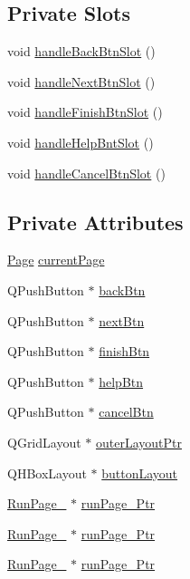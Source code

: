 \subsection*{Private Slots}
\begin{DoxyCompactItemize}
\item 
void \hyperlink{class_run_gui_abe8773e053b15ed96efcdb6e4b63e508}{handle\-Back\-Btn\-Slot} ()
\item 
void \hyperlink{class_run_gui_a267f472d21d57258adb28ebdcc83b256}{handle\-Next\-Btn\-Slot} ()
\item 
void \hyperlink{class_run_gui_a011495c9158d92b794941ac108b5b148}{handle\-Finish\-Btn\-Slot} ()
\item 
void \hyperlink{class_run_gui_ab29bf8394f8b23b2c1ffd33c6d2470eb}{handle\-Help\-Bnt\-Slot} ()
\item 
void \hyperlink{class_run_gui_a1127986fbf076ce480defe68d99171e1}{handle\-Cancel\-Btn\-Slot} ()
\end{DoxyCompactItemize}
\subsection*{Private Attributes}
\begin{DoxyCompactItemize}
\item 
\hyperlink{class_run_gui_acb4a3da6e31619ee4b0ac8c8f9cb64a3}{Page} \hyperlink{class_run_gui_a1d93e84df8a71767ca927554e5b0fe0d}{current\-Page}
\item 
Q\-Push\-Button $\ast$ \hyperlink{class_run_gui_a5a79c5d8f3a61510c2be51738e428473}{back\-Btn}
\item 
Q\-Push\-Button $\ast$ \hyperlink{class_run_gui_a02bb63cd6c6d77933f98087111ce1a66}{next\-Btn}
\item 
Q\-Push\-Button $\ast$ \hyperlink{class_run_gui_a2989fde08a236488c152c8fa584c3380}{finish\-Btn}
\item 
Q\-Push\-Button $\ast$ \hyperlink{class_run_gui_a6c0a17f55049da888442fbc28dff7a78}{help\-Btn}
\item 
Q\-Push\-Button $\ast$ \hyperlink{class_run_gui_aa14d8877052e9cc11c93055561501792}{cancel\-Btn}
\item 
Q\-Grid\-Layout $\ast$ \hyperlink{class_run_gui_ae4cdc2ec0797c9121a47b9cdf3b93115}{outer\-Layout\-Ptr}
\item 
Q\-H\-Box\-Layout $\ast$ \hyperlink{class_run_gui_a812f0836d9eb5b0148cf92b61bc53be2}{button\-Layout}
\item 
\hyperlink{class_run_page__1}{Run\-Page\-\_} $\ast$ \hyperlink{class_run_gui_aa52f64156c00bbd4e14c46b8113e3072}{run\-Page\-\_\-Ptr}
\item 
\hyperlink{class_run_page__2}{Run\-Page\-\_} $\ast$ \hyperlink{class_run_gui_a86764c1a0c9629fbce62c7cb13c5ee07}{run\-Page\-\_\-Ptr}
\item 
\hyperlink{class_run_page__3}{Run\-Page\-\_} $\ast$ \hyperlink{class_run_gui_a7306b4df6c8619a98da052935a021cf8}{run\-Page\-\_\-Ptr}
\end{DoxyCompactItemize}


